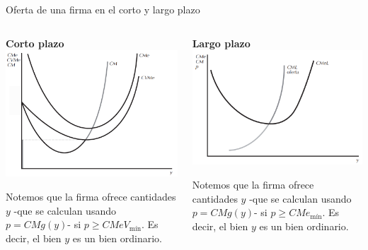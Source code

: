 \documentclass{beamer}
\theoremstyle{definition}
\begin{document}
\begin{frame}{Oferta de una firma en el corto y largo plazo}
\begin{columns}\hspace{-0.5em}
\begin{column}[t]{0.48\textwidth}
\begin{center}
\textbf{Corto plazo} \\
\includegraphics[scale=0.37]{figures4/oferta.png} 
\end{center}  \small Notemos que la firma ofrece cantidades $y$ -que se calculan usando $p=CMg(y)$- si $p \geq CMeV_{\text{mín}}$. Es decir, el bien $y$ es un bien ordinario.
\end{column}
\begin{column}[t]{0.48\textwidth}
\begin{center}
\textbf{Largo plazo} \\
\includegraphics[scale=0.4]{figures4/cmgLP.png}
\end{center}  \small Notemos que la firma ofrece cantidades $y$ -que se calculan usando $p=CMg(y)$- si $p \geq CMe_{\text{mín}}$. Es decir, el bien $y$ es un bien ordinario.
\end{column}
\end{columns}
\end{frame}
\end{document}
